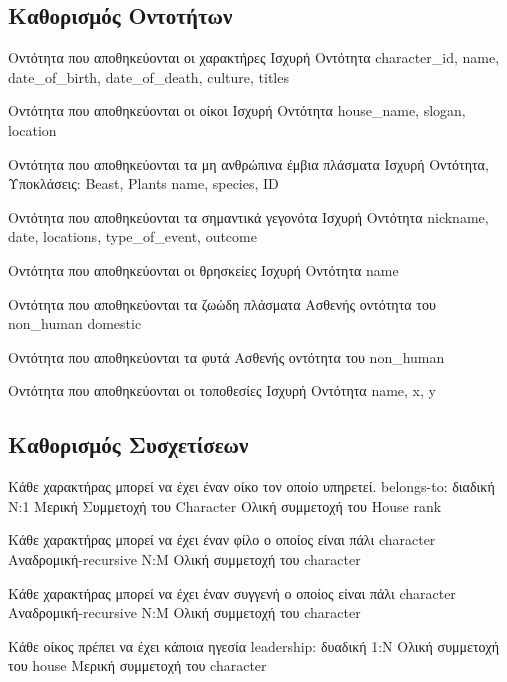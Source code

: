 \documentclass[../main.tex]{subfiles}
\begin{document}
\subsection{Καθορισμός Οντοτήτων}

{Οντότητα που αποθηκεύονται οι χαρακτήρες}
{Ισχυρή Οντότητα}
{character\_id, name, date\_of\_birth, date\_of\_death, culture, titles}

{Οντότητα που αποθηκεύονται οι οίκοι}
{Ισχυρή Οντότητα}
{house\_name, slogan, location}

{Οντότητα που αποθηκεύονται τα μη ανθρώπινα έμβια πλάσματα}
{Ισχυρή Οντότητα, Υποκλάσεις: Beast, Plants}
{name, species, ID}

{Οντότητα που αποθηκεύονται τα σημαντικά γεγονότα}
{Ισχυρή Οντότητα}
{nickname, date, locations, type\_of\_event, outcome}

{Οντότητα που αποθηκεύονται οι θρησκείες}
{Ισχυρή Οντότητα}
{name}

{Οντότητα που αποθηκεύονται τα ζωώδη πλάσματα}
{Ασθενής οντότητα του non\_human}
{domestic}

{Οντότητα που αποθηκεύονται τα φυτά}
{Ασθενής οντότητα του non\_human}
{}

{Οντότητα που αποθηκεύονται οι τοποθεσίες}
{Ισχυρή Οντότητα}
{name, x, y}



\subsection{Καθορισμός Συσχετίσεων}

{Κάθε χαρακτήρας μπορεί να έχει έναν οίκο τον οποίο υπηρετεί.}
{belongs-to: διαδική}
{N:1}
{Μερική Συμμετοχή του Character \newline Ολική συμμετοχή του House}
{rank}

{Κάθε χαρακτήρας μπορεί να έχει έναν φίλο ο οποίος είναι πάλι character}
{Αναδρομική-recursive}
{N:M}
{Ολική συμμετοχή του character}
{}

{Κάθε χαρακτήρας μπορεί να έχει έναν συγγενή ο οποίος είναι πάλι character}
{Αναδρομική-recursive}
{N:M}
{Ολική συμμετοχή του character}
{}

{Κάθε οίκος πρέπει να έχει κάποια ηγεσία}
{leadership: δυαδική}
{1:Ν}
{Ολική συμμετοχή του house \newline Μερική συμμετοχή του character}
{}
\end{document}
